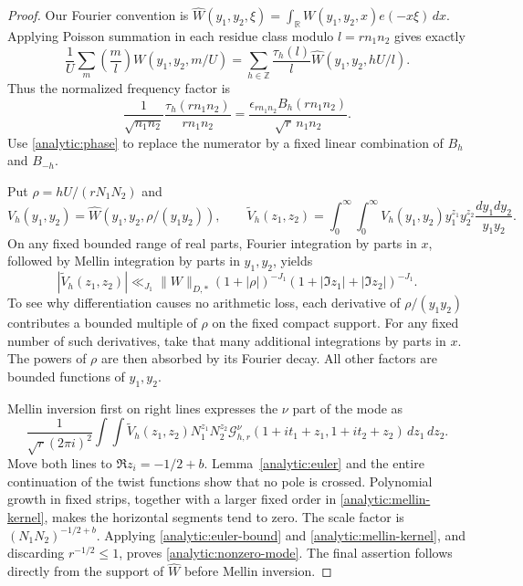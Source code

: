 \begin{proof}
Our Fourier convention is
$\widehat W(y_1,y_2,\xi)=\int_{\mathbb R}W(y_1,y_2,x)e(-x\xi)\,dx$.
Applying Poisson summation in each residue class modulo $l=rn_1n_2$
gives exactly
\[
 \frac1U\sum_m\left(\frac ml\right)W(y_1,y_2,m/U)
 =\sum_{h\in\mathbb Z}\frac{\tau_h(l)}l
                         \widehat W(y_1,y_2,hU/l).
\]
Thus the normalized frequency factor is
\[
 \frac{1}{\sqrt{n_1n_2}}\frac{\tau_h(rn_1n_2)}{rn_1n_2}
 =\frac{\epsilon_{rn_1n_2}B_h(rn_1n_2)}
       {\sqrt r\,n_1n_2}.
\]
Use \eqref{analytic:phase} to replace the numerator by a fixed linear
combination of $B_h$ and $B_{-h}$.

Put $\rho=hU/(rN_1N_2)$ and
\[
 V_h(y_1,y_2)=\widehat W(y_1,y_2,\rho/(y_1y_2)),\qquad
 \widetilde V_h(z_1,z_2)=
 \int_0^\infty\!\int_0^\infty
 V_h(y_1,y_2)y_1^{z_1}y_2^{z_2}
                    \frac{dy_1dy_2}{y_1y_2}.
\]
On any fixed bounded range of real parts, Fourier integration by parts
in $x$, followed by Mellin integration by parts in $y_1,y_2$, yields
\begin{equation}\label{analytic:mellin-kernel}
 |\widetilde V_h(z_1,z_2)|
 \ll_{J_1}\|W\|_{D,*}(1+|\rho|)^{-J_1}
                 (1+|\Im z_1|+|\Im z_2|)^{-J_1}.
\end{equation}
To see why differentiation causes no arithmetic loss, each derivative
of $\rho/(y_1y_2)$ contributes a bounded multiple of $\rho$ on the
fixed compact support. For any fixed number of such derivatives, take
that many additional integrations by parts in $x$. The powers of
$\rho$ are then absorbed by its Fourier decay. All other factors are
bounded functions of $y_1,y_2$.

Mellin inversion first on right lines expresses the $\nu$ part of the
mode as
\[
 \frac1{\sqrt r(2\pi i)^2}
 \int\!\int \widetilde V_h(z_1,z_2)N_1^{z_1}N_2^{z_2}
 \mathcal G_{h,r}^{\nu}(1+it_1+z_1,1+it_2+z_2)
 \,dz_1\,dz_2.
\]
Move both lines to $\Re z_i=-1/2+b$. Lemma~\ref{analytic:euler}
and the entire continuation of the twist functions show that no pole
is crossed. Polynomial growth in fixed strips, together with a larger
fixed order in \eqref{analytic:mellin-kernel}, makes the horizontal
segments tend to zero. The scale factor is
$(N_1N_2)^{-1/2+b}$. Applying
\eqref{analytic:euler-bound} and \eqref{analytic:mellin-kernel}, and
discarding $r^{-1/2}\leq1$, proves
\eqref{analytic:nonzero-mode}. The final assertion follows directly
from the support of $\widehat W$ before Mellin inversion.
\end{proof}

